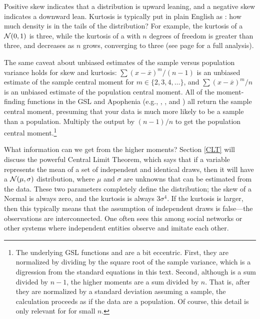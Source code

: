 Positive skew indicates that a distribution is upward leaning, and a negative
skew indicates a downward lean. Kurtosis is typically put in plain
English as : how much density is in the tails of the
distribution? For example, the kurtosis of a ${\cal N}(0,1)$ is three,
while the kurtosis of a  with $n$ degrees of
freedom is greater than three, and decreases as $n$ grows, converging to
three (see page \pageref{tkurt} for a full analysis).

 
 
\label{kurtskew}
The same caveat about unbiased estimates of the sample versus population
variance holds for skew and kurtosis: $\sum (x-\overline x)^m/(n-1)$
is an unbiased estimate of the sample central moment for $m \in\{2, 3,
4, \dots\}$, and $\sum (x-\overline x)^m/n$ is an unbiased estimate of
the population central moment. All of the moment-finding functions in
the GSL and Apophenia (e.g.,
,
, and
) all return the sample central
moment, presuming that your data is much more likely to be a sample than
a population. Multiply the output by $(n-1)/n$ to get the population
central moment.\footnote{The underlying GSL functions 
 and  are a bit
eccentric.   
First, they are 
normalized by dividing by the square root of the sample variance, which
is a digression from the standard equations in this text. Second, although
 is a sum divided by $n-1$, the higher moments
are a sum divided by $n$. That is, after they are normalized by a standard
deviation assuming a sample, the calculation proceeds as if the data are a
population. Of course, this detail is only relevant for for small $n$.}


What information can we get from the higher moments?  
Section
\ref{CLT} will discuss 
the powerful Central Limit Theorem, which says that if a variable
represents the mean of a set of independent and identical draws, then it
will have a ${\cal N}(\mu,\sigma)$ distribution, where $\mu$ and $\sigma$
are unknowns that can be estimated from the data. These two parameters
completely define the distribution; the skew of a Normal is always zero,
and the kurtosis is always $3\sigma^4$. If the kurtosis is larger,
then this typically means that the assumption of independent draws is
false---the observations are interconnected.\label{kurt1} One often sees
this among social networks or other systems where independent entities
observe and imitate each other.

